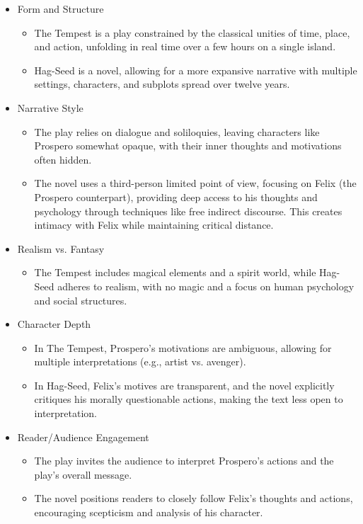 	\begin{itemize}

		\item Form and Structure

			\begin{itemize}
				\item The Tempest is a play constrained by the classical unities of time, place, and action, unfolding in real time over a few hours on a single island.
				\item Hag-Seed is a novel, allowing for a more expansive narrative with multiple settings, characters, and subplots spread over twelve years.
			\end{itemize}

		\item Narrative Style

			\begin{itemize}
				\item 
				The play relies on dialogue and soliloquies, leaving characters like Prospero somewhat opaque, with their inner thoughts and motivations often hidden.
				\item The novel uses a third-person limited point of view, focusing on Felix (the Prospero counterpart), providing deep access to his thoughts and psychology through techniques like free indirect discourse. This creates intimacy with Felix while maintaining critical distance.
			\end{itemize}

		\item Realism vs. Fantasy

			\begin{itemize}
				\item The Tempest includes magical elements and a spirit world, while Hag-Seed adheres to realism, with no magic and a focus on human psychology and social structures.
			\end{itemize}

		\item Character Depth
			
			\begin{itemize}
				\item In The Tempest, Prospero's motivations are ambiguous, allowing for multiple interpretations (e.g., artist vs. avenger).
				\item In Hag-Seed, Felix's motives are transparent, and the novel explicitly critiques his morally questionable actions, making the text less open to interpretation.
			\end{itemize}

		\item Reader/Audience Engagement
			
			\begin{itemize}
				\item The play invites the audience to interpret Prospero's actions and the play's overall message.
				\item The novel positions readers to closely follow Felix's thoughts and actions, encouraging scepticism and analysis of his character. 
			\end{itemize}
	\end{itemize}

